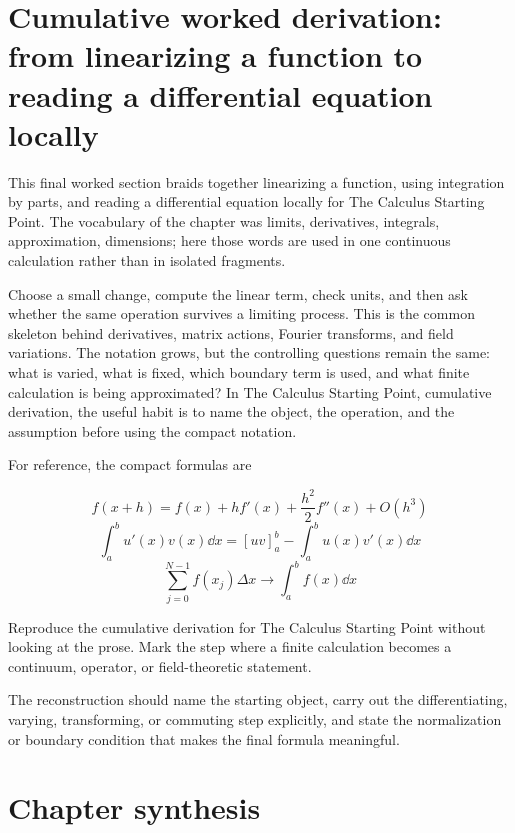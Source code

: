 \section{Cumulative worked derivation: from linearizing a function to reading a differential equation locally}

This final worked section braids together linearizing a function, using integration by parts, and reading a differential equation locally for The Calculus Starting Point.  The vocabulary of the chapter was limits, derivatives, integrals, approximation, dimensions; here those words are used in one continuous calculation rather than in isolated fragments.

Choose a small change, compute the linear term, check units, and then ask whether the same operation survives a limiting process.  This is the common skeleton behind derivatives, matrix actions, Fourier transforms, and field variations.  The notation grows, but the controlling questions remain the same: what is varied, what is fixed, which boundary term is used, and what finite calculation is being approximated?  In The Calculus Starting Point, cumulative derivation, the useful habit is to name the object, the operation, and the assumption before using the compact notation.

For reference, the compact formulas are

\[
  f(x+h)=f(x)+hf'(x)+\frac{h^2}{2}f''(x)+O(h^3)
\]
\[
  \int_a^b u'(x)v(x)\dd x=[uv]_a^b-\int_a^b u(x)v'(x)\dd x
\]
\[
  \sum_{j=0}^{N-1}f(x_j)\Delta x\longrightarrow \int_a^b f(x)\dd x
\]

\begin{exercise}
Reproduce the cumulative derivation for The Calculus Starting Point without looking at the prose.  Mark the step where a finite calculation becomes a continuum, operator, or field-theoretic statement.
\begin{answer}
The reconstruction should name the starting object, carry out the differentiating, varying, transforming, or commuting step explicitly, and state the normalization or boundary condition that makes the final formula meaningful.
\end{answer}
\end{exercise}



\section{Chapter synthesis}


